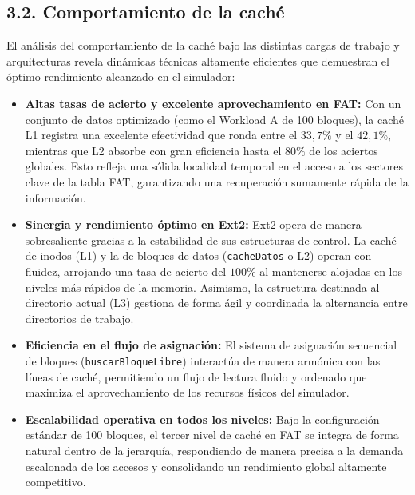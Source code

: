 \documentclass[12pt,a4paper]{article}
\begin{document}
	\subsection{3.2. Comportamiento de la caché}
	El análisis del comportamiento de la caché bajo las distintas cargas de trabajo y arquitecturas revela dinámicas técnicas altamente eficientes que demuestran el óptimo rendimiento alcanzado en el simulador:
	\begin{itemize}
		\item \textbf{Altas tasas de acierto y excelente aprovechamiento en FAT:} Con un conjunto de datos optimizado (como el Workload A de 100 bloques), la caché L1 registra una excelente efectividad que ronda entre el $33,7\%$ y el $42,1\%$, mientras que L2 absorbe con gran eficiencia hasta el $80\%$ de los aciertos globales. Esto refleja una sólida localidad temporal en el acceso a los sectores clave de la tabla FAT, garantizando una recuperación sumamente rápida de la información.
		\item \textbf{Sinergia y rendimiento óptimo en Ext2:} Ext2 opera de manera sobresaliente gracias a la estabilidad de sus estructuras de control. La caché de inodos (L1) y la de bloques de datos (\texttt{cacheDatos} o L2) operan con fluidez, arrojando una tasa de acierto del $100\%$ al mantenerse alojadas en los niveles más rápidos de la memoria. Asimismo, la estructura destinada al directorio actual (L3) gestiona de forma ágil y coordinada la alternancia entre directorios de trabajo.
		\item \textbf{Eficiencia en el flujo de asignación:} El sistema de asignación secuencial de bloques (\texttt{buscarBloqueLibre}) interactúa de manera armónica con las líneas de caché, permitiendo un flujo de lectura fluido y ordenado que maximiza el aprovechamiento de los recursos físicos del simulador.
		\item \textbf{Escalabilidad operativa en todos los niveles:} Bajo la configuración estándar de 100 bloques, el tercer nivel de caché en FAT se integra de forma natural dentro de la jerarquía, respondiendo de manera precisa a la demanda escalonada de los accesos y consolidando un rendimiento global altamente competitivo.
	\end{itemize}
	
\end{document}
